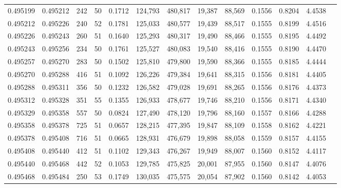 \begin{tabular}{rrrrrrrrrrrrr}
0.495199 & 0.495212 & 242 &  50 &                                     0.1712 & 124,793 & 480,817 &  19,387 &  88,569 & 0.1556 & 0.8204 & 4.4538 \\
0.495212 & 0.495226 & 240 &  52 &                                     0.1781 & 125,033 & 480,577 &  19,439 &  88,517 & 0.1555 & 0.8199 & 4.4516 \\
0.495226 & 0.495243 & 260 &  51 &                                     0.1640 & 125,293 & 480,317 &  19,490 &  88,466 & 0.1555 & 0.8195 & 4.4492 \\
0.495243 & 0.495256 & 234 &  50 &                                     0.1761 & 125,527 & 480,083 &  19,540 &  88,416 & 0.1555 & 0.8190 & 4.4470 \\
0.495257 & 0.495270 & 283 &  50 &                                     0.1502 & 125,810 & 479,800 &  19,590 &  88,366 & 0.1555 & 0.8185 & 4.4444 \\
0.495270 & 0.495288 & 416 &  51 &                                     0.1092 & 126,226 & 479,384 &  19,641 &  88,315 & 0.1556 & 0.8181 & 4.4405 \\
0.495288 & 0.495311 & 356 &  50 &                                     0.1232 & 126,582 & 479,028 &  19,691 &  88,265 & 0.1556 & 0.8176 & 4.4373 \\
0.495312 & 0.495328 & 351 &  55 &                                     0.1355 & 126,933 & 478,677 &  19,746 &  88,210 & 0.1556 & 0.8171 & 4.4340 \\
0.495329 & 0.495358 & 557 &  50 &                                     0.0824 & 127,490 & 478,120 &  19,796 &  88,160 & 0.1557 & 0.8166 & 4.4288 \\
0.495358 & 0.495378 & 725 &  51 &                                     0.0657 & 128,215 & 477,395 &  19,847 &  88,109 & 0.1558 & 0.8162 & 4.4221 \\
0.495378 & 0.495408 & 716 &  51 &                                     0.0665 & 128,931 & 476,679 &  19,898 &  88,058 & 0.1559 & 0.8157 & 4.4155 \\
0.495408 & 0.495440 & 412 &  51 &                                     0.1102 & 129,343 & 476,267 &  19,949 &  88,007 & 0.1560 & 0.8152 & 4.4117 \\
0.495440 & 0.495468 & 442 &  52 &                                     0.1053 & 129,785 & 475,825 &  20,001 &  87,955 & 0.1560 & 0.8147 & 4.4076 \\
0.495468 & 0.495484 & 250 &  53 &                                     0.1749 & 130,035 & 475,575 &  20,054 &  87,902 & 0.1560 & 0.8142 & 4.4053 \\

\end{tabular}
